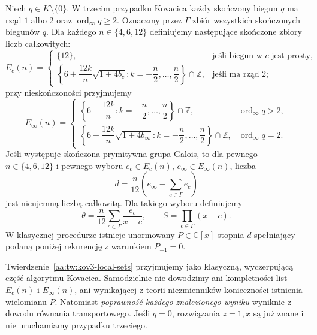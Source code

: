 \begin{twierdzenie}
\label{aa:tw:kov3-local-sets}
Niech $q\in K\setminus\{0\}$.
W trzecim przypadku Kovacica każdy
skończony biegun $q$ ma rząd $1$ albo $2$
oraz $\operatorname{ord}_{\infty}q\ge2$.
Oznaczmy przez $\Gamma$ zbiór
wszystkich skończonych biegunów $q$.
Dla każdego $n\in\{4,6,12\}$
definiujemy następujące
skończone zbiory liczb całkowitych:
\begin{equation}\label{aa:eq:kov3-local-sets}
 E_c(n)=
 \begin{cases}
 \{12\},&\text{jeśli biegun w $c$ jest prosty},\\[2pt]
 \left\{6+\dfrac{12k}{n}\sqrt{1+4b_c}:
       k=-\dfrac n2,\ldots,\dfrac n2\right\}
       \cap\mathbb Z,
       &\text{jeśli ma rząd $2$};
 \end{cases}
\end{equation}
przy nieskończoności przyjmujemy
\begin{equation}\label{aa:eq:kov3-infinity-sets}
 E_\infty(n)=
 \begin{cases}
 \left\{6+\dfrac{12k}{n}:
       k=-\dfrac n2,\ldots,\dfrac n2\right\}
       \cap\mathbb Z,
       &\operatorname{ord}_{\infty}q>2,\\[2pt]
 \left\{6+\dfrac{12k}{n}\sqrt{1+4b_\infty}:
       k=-\dfrac n2,\ldots,\dfrac n2\right\}
       \cap\mathbb Z,
       &\operatorname{ord}_{\infty}q=2 .
 \end{cases}
\end{equation}
Jeśli występuje skończona
prymitywna grupa Galois, to
dla pewnego $n\in\{4,6,12\}$
i pewnego wyboru
$e_c\in E_c(n)$,
$e_\infty\in E_\infty(n)$,
liczba
\begin{equation}\label{aa:eq:kov3-degree}
 d=\frac n{12}
       \left(e_\infty-\sum_{c\in\Gamma}e_c\right)
\end{equation}
jest nieujemną liczbą całkowitą.
Dla takiego wyboru definiujemy
\begin{equation}\label{aa:eq:kov3-theta-S}
 \theta=\frac n{12}\sum_{c\in\Gamma}
                   \frac{e_c}{x-c},
 \qquad S=\prod_{c\in\Gamma}(x-c).
\end{equation}
W klasycznej procedurze
istnieje unormowany
$P\in\mathbb C[x]$ stopnia $d$
spełniający podaną poniżej
rekurencję z warunkiem
$P_{-1}=0$.
\end{twierdzenie}

\begin{uwaga}
\label{aa:uw:kov3-sets-cited}
Twierdzenie~\ref{aa:tw:kov3-local-sets}
przyjmujemy jako klasyczną,
wyczerpującą część algorytmu
Kovacica. Samodzielnie
nie dowodzimy ani kompletności
list $E_c(n)$ i $E_\infty(n)$,
ani wynikającej z teorii
niezmienników konieczności
istnienia wielomianu $P$.
Natomiast \emph{poprawność
każdego znalezionego wyniku}
wyniknie z dowodu równania
transportowego. Jeśli $q=0$,
rozwiązania $z=1,x$ są już
znane i nie uruchamiamy
przypadku trzeciego.
\end{uwaga}

